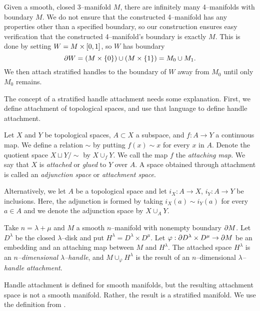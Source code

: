 \label{chapter:problem}

Given a smooth, closed 3--manifold $M$, there are infinitely many 4--manifolds with boundary $M$.
We do not ensure that the constructed 4--manifold has any properties other than a specified boundary, so our construction ensures easy verification that the constructed 4--manifold's boundary is exactly $M$.
This is done by setting $W=M\times [0,1]$, so $W$ has boundary 
\[
	\partial W = (M\times\{0\}) \cup (M\times\{1\}) = M_0 \cup M_1.
\]
We then attach stratified handles to the boundary of $W$ away from $M_0$ until only $M_0$ remains.

The concept of a stratified handle attachment needs some explanation.
First, we define attachment of topological spaces, and use that language to define handle attachment.

\begin{defn}[Attachment]
	Let $X$ and $Y$ be topological spaces, $A\subset X$ a subspace, and $f:A\to Y$ a continuous map.
	We define a relation $\sim$ by putting $f(x)\sim x$ for every $x$ in $A$.
	Denote the quotient space $X\sqcup Y/\sim$ by $X\cup_f Y$.
	We call the map $f$ the \emph{attaching map}.  
	We say that $X$ is \emph{attached} or \emph{glued} to $Y$ over $A$.
	A space obtained through attachment is called an \emph{adjunction space} or \emph{attachment space}.
	
	Alternatively, we let $A$ be a topological space and let $i_X:A\to X$, $i_Y:A\to Y$ be inclusions.
	Here, the adjunction is formed by taking $i_X(a)\sim i_Y(a)$ for every $a\in A$ and we denote the adjunction space by $X\cup_A Y$.
\end{defn}

\begin{defn}[Handle]
	\label{def:handle}
	Take $n=\lambda+\mu$ and $M$ a smooth $n$--manifold with nonempty boundary $\partial M$.
	Let $D^\lambda$ be the closed $\lambda$--disk and put $H^\lambda = D^\lambda\times D^\mu$.
	Let $\varphi:\partial D^\lambda\times D^\mu\to\partial M$ be an embedding and an attaching map between $M$ and $H^\lambda$.
	The attached space $H^\lambda$ is an \emph{$n$--dimensional $\lambda$--handle}, and $M\cup_\varphi H^\lambda$ is the result of an $n$--dimensional \emph{$\lambda$--handle attachment}.
\end{defn}

Handle attachment is defined for smooth manifolds, but the resulting attachment space is not a smooth manifold.
Rather, the result is a stratified manifold.
We use the definition from \cite{wein94}.

